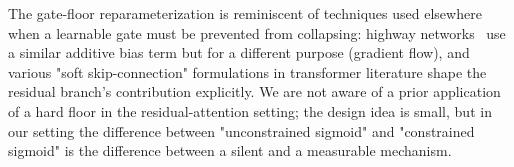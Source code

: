 The gate-floor reparameterization is reminiscent of techniques used elsewhere when a learnable gate must be prevented from collapsing: highway networks~\cite{srivastava2015highway} use a similar additive bias term but for a different purpose (gradient flow), and various "soft skip-connection" formulations in transformer literature shape the residual branch's contribution explicitly. We are not aware of a prior application of a hard floor in the residual-attention setting; the design idea is small, but in our setting the difference between "unconstrained sigmoid" and "constrained sigmoid" is the difference between a silent and a measurable mechanism.
